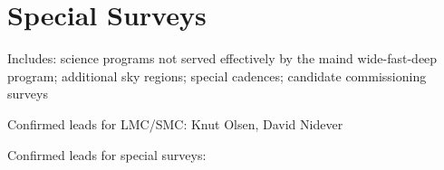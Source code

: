 \chapter[Special Surveys]{Special Surveys}
\label{chp:specialsurveys}


Includes: science programs not served effectively by the maind
wide-fast-deep program; additional sky regions; special cadences;
candidate commissioning surveys

Confirmed leads for LMC/SMC: Knut Olsen, David Nidever

Confirmed leads for special surveys:
